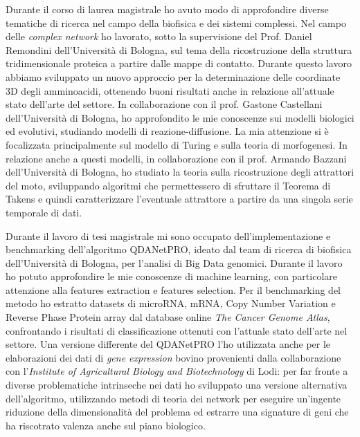 \documentclass[a4paper,11pt]{article}
\begin{document}
Durante il corso di laurea magistrale ho avuto modo di approfondire diverse tematiche di ricerca nel campo della biofisica e dei sistemi complessi.
Nel campo delle \emph{complex network} ho lavorato, sotto la supervisione del Prof. Daniel Remondini dell'Università di Bologna, sul tema della ricostruzione della struttura tridimensionale proteica a partire dalle mappe di contatto.
Durante questo lavoro abbiamo sviluppato un nuovo approccio per la determinazione delle coordinate 3D degli amminoacidi, ottenendo buoni risultati anche in relazione all'attuale stato dell'arte del settore.
In collaborazione con il prof. Gastone Castellani dell'Università di Bologna, ho approfondito le mie conoscenze sui modelli biologici ed evolutivi, studiando modelli di reazione-diffusione.
La mia attenzione si è focalizzata principalmente sul modello di Turing e sulla teoria di morfogenesi.
In relazione anche a questi modelli, in collaborazione con il prof. Armando Bazzani dell'Università di Bologna, ho studiato la teoria sulla ricostruzione degli attrattori del moto, sviluppando algoritmi che permettessero di sfruttare il Teorema di Takens e quindi caratterizzare l'eventuale attrattore a partire da una singola serie temporale di dati.

Durante il lavoro di tesi magistrale mi sono occupato dell'implementazione e benchmarking dell'algoritmo QDANetPRO, ideato dal team di ricerca di biofisica dell'Università di Bologna, per l'analisi di Big Data genomici.
Durante il lavoro ho potuto approfondire le mie conoscenze di machine learning, con particolare attenzione alla features extraction e features selection.
Per il benchmarking del metodo ho estratto datasets di microRNA, mRNA, Copy Number Variation e Reverse Phase Protein array dal database online \emph{The Cancer Genome Atlas}, confrontando i risultati di classificazione ottenuti con l'attuale stato dell'arte nel settore.
Una versione differente del QDANetPRO l'ho utilizzata anche per le elaborazioni dei dati di \emph{gene expression} bovino provenienti dalla collaborazione con l'\emph{Institute of Agricultural Biology and Biotechnology} di Lodi: per far fronte a diverse problematiche intrinseche nei dati ho sviluppato una versione alternativa dell'algoritmo, utilizzando metodi di teoria dei network per eseguire un'ingente riduzione della dimensionalità del problema ed estrarre una signature di geni che ha riscotrato valenza anche sul piano biologico.
\end{document}
